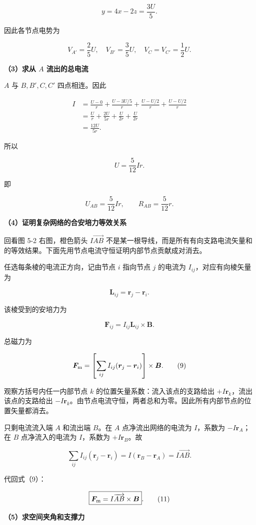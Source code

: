 \documentclass[12pt,a4paper,UTF8]{ctexart}
\begin{document}
\[
y=4x-2z=\frac{3U}{5}.
\tag{6}
\]

因此各节点电势为

\[
V_{A'}=\frac25U,
\quad
V_{B'}=\frac35U,
\quad
V_C=V_{C'}=\frac12U.
\]

\textbf{（3）求从 \(A\) 流出的总电流}

\(A\) 与 \(B,B',C,C'\) 四点相连。因此

\[
\begin{aligned}
I
&=\frac{U-0}{r}
+\frac{U-3U/5}{r}
+\frac{U-U/2}{r}
+\frac{U-U/2}{r}\\
&=\frac Ur+\frac{2U}{5r}+\frac{U}{2r}+\frac{U}{2r}\\
&=\frac{12U}{5r}.
\end{aligned}
\tag{7}
\]

所以

\[
U=\frac{5}{12}Ir.
\]

即

\[
\boxed{U_{AB}=\frac{5}{12}Ir},
\qquad
\boxed{R_{AB}=\frac{5}{12}r}.
\tag{8}
\]

\textbf{（4）证明复杂网络的合安培力等效关系}

回看图 5-2 右图，橙色箭头 \(I\overrightarrow{AB}\)
不是某一根导线，而是所有有向支路电流矢量和的等效结果。下面先用节点电流守恒证明内部节点贡献成对消去。

任选每条棱的电流正方向，记由节点 \(i\) 指向节点 \(j\) 的电流为
\(I_{ij}\)，对应有向棱矢量为

\[
\bm L_{ij}=\bm r_j-\bm r_i.
\]

该棱受到的安培力为

\[
\bm F_{ij}=I_{ij}\bm L_{ij}\times\bm B.
\]

总磁力为

\[
\bm F_{\rm m}
=\left[\sum_{ij}I_{ij}(\bm r_j-\bm r_i)\right]\times\bm B.
\tag{9}
\]

观察方括号内任一内部节点 \(k\) 的位置矢量系数：流入该点的支路给出
\(+I\bm r_k\)，流出该点的支路给出
\(-I\bm r_k\)。由节点电流守恒，两者总和为零。因此所有内部节点的位置矢量都消去。

只剩电流流入端 \(A\) 和流出端 \(B\)。在 \(A\) 点净流出网络的电流为
\(I\)，系数为 \(-I\bm r_A\)；在 \(B\) 点净流入的电流为 \(I\)，系数为
\(+I\bm r_B\)。故

\[
\sum_{ij}I_{ij}(\bm r_j-\bm r_i)
=I(\bm r_B-\bm r_A)
=I\overrightarrow{AB}.
\tag{10}
\]

代回式（9）：

\[
\boxed{\bm F_{\rm m}=I\overrightarrow{AB}\times\bm B}.
\tag{11}
\]

\textbf{（5）求空间夹角和支撑力}
\end{document}
